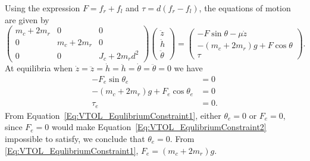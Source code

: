%
Using the expression $F = f_r + f_l$ and $\tau = d (f_r - f_l)$, the equations of motion are given by
\begin{equation*}
\begin{pmatrix}
m_c + 2 m_r & 0           & 0 \\
0           & m_c + 2 m_r & 0 \\
0           & 0           & J_c + 2 m_r d^2
\end{pmatrix}
\begin{pmatrix}
\ddot{z} \\
\ddot{h} \\
\ddot{\theta}
\end{pmatrix}
=
\begin{pmatrix}
-F \sin\theta - \mu \dot{z} \\
-(m_c + 2 m_r) g + F \cos\theta \\
\tau
\end{pmatrix}.
\end{equation*}
At equilibria when $\dot{z} = \ddot{z} = \dot{h} = \ddot{h} = \dot{\theta} = \ddot{\theta} = 0$ we have
\begin{align}
- F_e \sin\theta_e &= 0 \label{Eq:VTOL_EqulibriumConstraint1} \\
- \left( m_c + 2 m_r\right) g + F_e\cos\theta_e &= 0 \label{Eq:VTOL_EqulibriumConstraint2} \\
\tau_e &= 0. \label{Eq:VTOL_EqulibriumConstraint3}
\end{align}
From Equation~\eqref{Eq:VTOL_EqulibriumConstraint1}, either $\theta_e = 0$ or $F_e = 0$, since $F_e = 0$ would make Equation~\eqref{Eq:VTOL_EqulibriumConstraint2} impossible to satisfy, we conclude that $\theta_e = 0$.
From \eqref{Eq:VTOL_EqulibriumConstraint1}, $F_e = \left(m_c + 2 m_r\right) g$.


